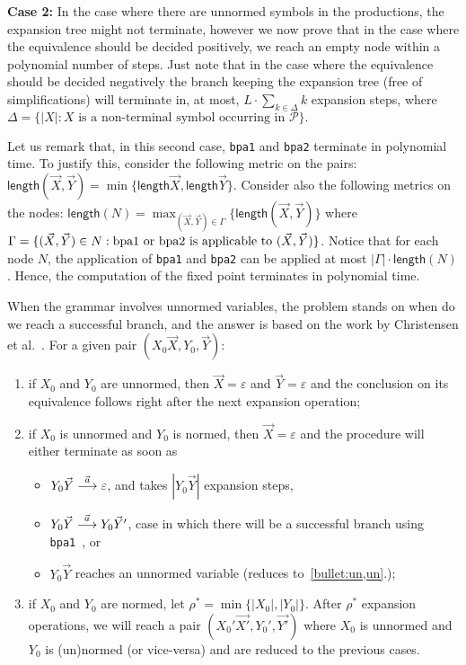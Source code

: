 \noindent\textbf{Case 2:} In the case where there are unnormed symbols
in the productions, the expansion tree might not terminate, however
we now prove that in the case where the equivalence should be decided
positively, we reach an empty node within a polynomial number of steps.
Just note that in the case where the equivalence should be decided negatively
the branch keeping the expansion tree (free of simplifications) will
terminate in, at most, $L\cdot \sum_{k\in\Delta} k$ expansion steps, 
where $\Delta = \{|X| : X \text{ is a non-terminal symbol 
occurring in }\mathcal{P}\}.$

Let us remark that, in this second case, \lstinline{bpa1} and 
\lstinline{bpa2} terminate in polynomial time. 
To justify this, consider the following
metric on the pairs: $\mathsf{length}(\vec X, \vec Y) = 
\min \{\mathsf{length} \vec X, \mathsf{length} \vec Y\}.$ 
Consider also the following metrics on the nodes:
$\mathsf{length}(N) = \max_{(\vec X, \vec Y)\in \Gamma} 
\{\mathsf{length}(\vec X, \vec Y)\}$
where $\Gamma=\{(\vec X,\vec Y)\in N : \text{\lstinline{bpa1} or  
\lstinline{bpa2} is applicable to }(\vec X,\vec Y) \}$. 
Notice that for each node $N$, the application
of \lstinline{bpa1} and \lstinline{bpa2} can be applied at most
$|\Gamma|\cdot\mathsf{length}(N)$. Hence, the computation
of the fixed point terminates in polynomial time. 
 
When the grammar involves unnormed variables, the problem
stands on when do we reach a successful branch, and the
answer is based on the work by Christensen et 
al.~\cite{DBLP:journals/iandc/ChristensenHS95}.
For a given pair $(X_0\vec X, Y_0,\vec Y)$:
\begin{enumerate}
	\item \label{bullet:un,un}  if $X_0$ and $Y_0$ are unnormed, then 
		  $\vec X = \varepsilon$
		  and $\vec Y = \varepsilon$ and the conclusion on its equivalence
		  follows right after the next expansion operation;
	\item if $X_0$ is unnormed and $Y_0$ is normed, then $\vec X = \varepsilon$
		  and the procedure will either terminate as soon as
		  \begin{itemize}
		  	\item $Y_0\vec Y\LTSderives[\vec a] \varepsilon$, and takes 
		  		  $|Y_0\vec Y|$ expansion steps,
		  	\item $Y_0\vec Y\LTSderives[\vec a] Y_0\vec Y'$, case in which
		  		  there will be a successful branch using 
		  		  \lstinline{bpa1}~\cite{DBLP:journals/iandc/ChristensenHS95}, or
		  	\item $Y_0\vec Y$ reaches an unnormed variable 
		  		  (reduces to~\ref{bullet:un,un}.);
		  \end{itemize}
	\item if $X_0$ and $Y_0$ are normed, let 
		  $\rho^* = \min \{|X_0|, |Y_0|\}$. After $\rho^*$ expansion
		  operations, we will reach a pair $(X_0'\vec{X'}, Y_0',\vec{Y'})$
		  where $X_0$ is unnormed and $Y_0$ is (un)normed (or vice-versa)
		  and are reduced to the previous cases.
\end{enumerate}

